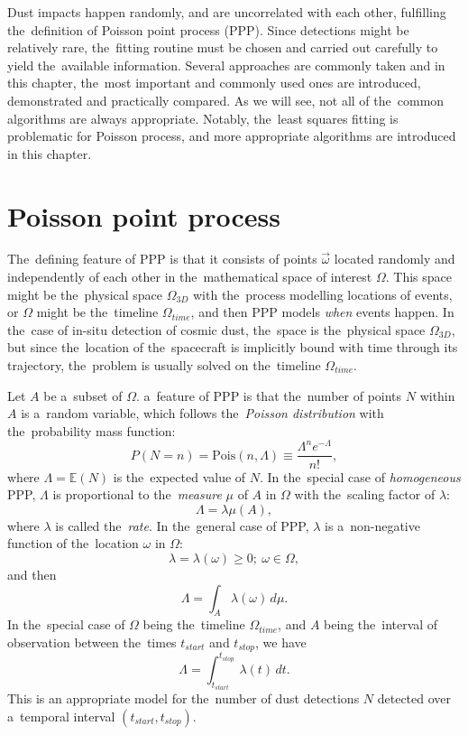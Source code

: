 Dust impacts happen randomly, and are uncorrelated with each other, fulfilling the~definition of {Poisson point process} (PPP). Since detections might be relatively rare, the~fitting routine must be chosen and carried out carefully to yield the~available information. Several approaches are commonly taken and in this chapter, the~most important and commonly used ones are introduced, demonstrated and practically compared. As we will see, not all of the~common algorithms are always appropriate. Notably, the~least squares fitting is problematic for Poisson process, and more appropriate algorithms are introduced in this chapter.

\section{Poisson point process}

The~defining feature of PPP is that it consists of points $\vec{\omega}$ located randomly and independently of each other in the~mathematical space of interest $\Omega$. This space might be the~physical space $\Omega_{3D}$ with the~process modelling locations of events, or $\Omega$ might be the~timeline $\Omega_{time}$, and then PPP models \textit{when} events happen. In the~case of in-situ detection of cosmic dust, the~space is the~physical space $\Omega_{3D}$, but since the~location of the~spacecraft is implicitly bound with time through its trajectory, the~problem is usually solved on the~timeline $\Omega_{time}$.

Let $A$ be a~subset of $\Omega$. a~feature of PPP is that the~number of points $N$ within $A$ is a~random variable, which follows the~\textit{Poisson distribution} with the~probability mass function:
\begin{equation}
    P(N=n) = \mathrm{Pois}(n,\Lambda) \equiv \frac{\Lambda^n e^{-\Lambda}}{n!}, \label{eq:poisson_pmf}
\end{equation}
where $\Lambda = \mathbb{E}(N)$ is the~expected value of $N$. In the~special case of \textit{homogeneous} PPP, $\Lambda$ is proportional to the~\textit{measure} $\mu$ of $A$ in $\Omega$ with the~scaling factor of $\lambda$:
\begin{equation}
    \Lambda = \lambda \mu(A),
\end{equation}
where $\lambda$ is called the~\textit{rate}. In the~general case of PPP, $\lambda$ is a~non-negative function of the~location $\omega$ in $\Omega$:
\begin{equation}
    \lambda = \lambda(\omega) \geq 0; \ \omega \in \Omega,
\end{equation}
and then 
\begin{equation}
    \Lambda = \int_A \lambda(\omega) \, d\mu.
\end{equation}
In the~special case of $\Omega$ being the~timeline $\Omega_{time}$, and $A$ being the~interval of observation between the~times $t_{start}$ and $t_{stop}$, we have
\begin{equation}
    \Lambda = \int_{t_{start}}^{t_{stop}} \lambda(t) \, dt.
\end{equation}
This is an appropriate model for the~number of dust detections $N$ detected over a~temporal interval $(t_{start},t_{stop})$.

